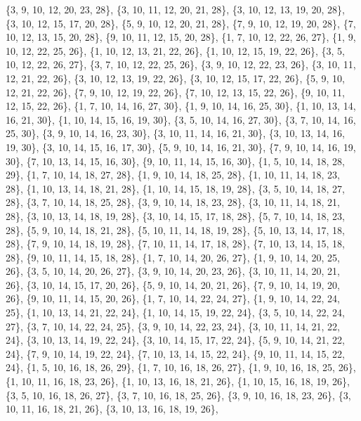 \documentclass[11pt,a4paper]{article}
\begin{document}
{\{3, 9, 10, 12, 20, 23, 28\}, \{3, 10, 11, 12, 20, 21, 28\}, \{3, 10, 12, 13, 19, 20, 28\}, \{3, 10, 12, 15, 17, 20, 28\}, \{5, 9, 10, 12, 20, 21, 28\},
\{7, 9, 10, 12, 19, 20, 28\}, \{7, 10, 12, 13, 15, 20, 28\}, \{9, 10, 11, 12, 15, 20, 28\}, \{1, 7, 10, 12, 22, 26, 27\}, \{1, 9, 10, 12, 22, 25, 26\},
\{1, 10, 12, 13, 21, 22, 26\}, \{1, 10, 12, 15, 19, 22, 26\}, \{3, 5, 10, 12, 22, 26, 27\}, \{3, 7, 10, 12, 22, 25, 26\}, \{3, 9, 10, 12, 22, 23, 26\},
\{3, 10, 11, 12, 21, 22, 26\}, \{3, 10, 12, 13, 19, 22, 26\}, \{3, 10, 12, 15, 17, 22, 26\}, \{5, 9, 10, 12, 21, 22, 26\}, \{7, 9, 10, 12, 19, 22, 26\},
\{7, 10, 12, 13, 15, 22, 26\}, \{9, 10, 11, 12, 15, 22, 26\}, \{1, 7, 10, 14, 16, 27, 30\}, \{1, 9, 10, 14, 16, 25, 30\}, \{1, 10, 13, 14, 16, 21, 30\},
\{1, 10, 14, 15, 16, 19, 30\}, \{3, 5, 10, 14, 16, 27, 30\}, \{3, 7, 10, 14, 16, 25, 30\}, \{3, 9, 10, 14, 16, 23, 30\}, \{3, 10, 11, 14, 16, 21, 30\},
\{3, 10, 13, 14, 16, 19, 30\}, \{3, 10, 14, 15, 16, 17, 30\}, \{5, 9, 10, 14, 16, 21, 30\}, \{7, 9, 10, 14, 16, 19, 30\}, \{7, 10, 13, 14, 15, 16, 30\},
\{9, 10, 11, 14, 15, 16, 30\}, \{1, 5, 10, 14, 18, 28, 29\}, \{1, 7, 10, 14, 18, 27, 28\}, \{1, 9, 10, 14, 18, 25, 28\}, \{1, 10, 11, 14, 18, 23, 28\},
\{1, 10, 13, 14, 18, 21, 28\}, \{1, 10, 14, 15, 18, 19, 28\}, \{3, 5, 10, 14, 18, 27, 28\}, \{3, 7, 10, 14, 18, 25, 28\}, \{3, 9, 10, 14, 18, 23, 28\},
\{3, 10, 11, 14, 18, 21, 28\}, \{3, 10, 13, 14, 18, 19, 28\}, \{3, 10, 14, 15, 17, 18, 28\}, \{5, 7, 10, 14, 18, 23, 28\}, \{5, 9, 10, 14, 18, 21, 28\},
\{5, 10, 11, 14, 18, 19, 28\}, \{5, 10, 13, 14, 17, 18, 28\}, \{7, 9, 10, 14, 18, 19, 28\}, \{7, 10, 11, 14, 17, 18, 28\}, \{7, 10, 13, 14, 15, 18, 28\},
\{9, 10, 11, 14, 15, 18, 28\}, \{1, 7, 10, 14, 20, 26, 27\}, \{1, 9, 10, 14, 20, 25, 26\}, \{3, 5, 10, 14, 20, 26, 27\}, \{3, 9, 10, 14, 20, 23, 26\},
\{3, 10, 11, 14, 20, 21, 26\}, \{3, 10, 14, 15, 17, 20, 26\}, \{5, 9, 10, 14, 20, 21, 26\}, \{7, 9, 10, 14, 19, 20, 26\}, \{9, 10, 11, 14, 15, 20, 26\},
\{1, 7, 10, 14, 22, 24, 27\}, \{1, 9, 10, 14, 22, 24, 25\}, \{1, 10, 13, 14, 21, 22, 24\}, \{1, 10, 14, 15, 19, 22, 24\}, \{3, 5, 10, 14, 22, 24, 27\},
\{3, 7, 10, 14, 22, 24, 25\}, \{3, 9, 10, 14, 22, 23, 24\}, \{3, 10, 11, 14, 21, 22, 24\}, \{3, 10, 13, 14, 19, 22, 24\}, \{3, 10, 14, 15, 17, 22, 24\},
\{5, 9, 10, 14, 21, 22, 24\}, \{7, 9, 10, 14, 19, 22, 24\}, \{7, 10, 13, 14, 15, 22, 24\}, \{9, 10, 11, 14, 15, 22, 24\}, \{1, 5, 10, 16, 18, 26, 29\},
\{1, 7, 10, 16, 18, 26, 27\}, \{1, 9, 10, 16, 18, 25, 26\}, \{1, 10, 11, 16, 18, 23, 26\}, \{1, 10, 13, 16, 18, 21, 26\}, \{1, 10, 15, 16, 18, 19, 26\},
\{3, 5, 10, 16, 18, 26, 27\}, \{3, 7, 10, 16, 18, 25, 26\}, \{3, 9, 10, 16, 18, 23, 26\}, \{3, 10, 11, 16, 18, 21, 26\}, \{3, 10, 13, 16, 18, 19, 26\},
}
\end{document}
